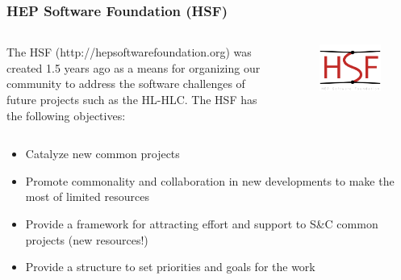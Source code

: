\begin{frame}
\frametitle{HEP Software Foundation (HSF)}

\begin{columns}[T] %

\begin{column}{.75\textwidth}
The HSF (http://hepsoftwarefoundation.org) was created 1.5 years ago as a means for organizing our community to address the software challenges of future projects such as the HL-HLC. The HSF has the following objectives: 
\end{column}%

\hfill%

\begin{column}{.20\textwidth}
\begin{figure}[htbp]
\begin{center}
\includegraphics[width=1.0\textwidth]{images/hsf_logo_angled.png}
\end{center}
\end{figure}
\end{column}%

\end{columns}

\vskip 0.1in

\begin{itemize}
\item Catalyze new common projects
\item Promote commonality and collaboration in new developments to make the most of limited resources
\item Provide a framework for attracting effort and support to S\&C common projects (new resources!)
\item Provide a structure to set priorities and goals for the work
\end{itemize}



\end{frame}


